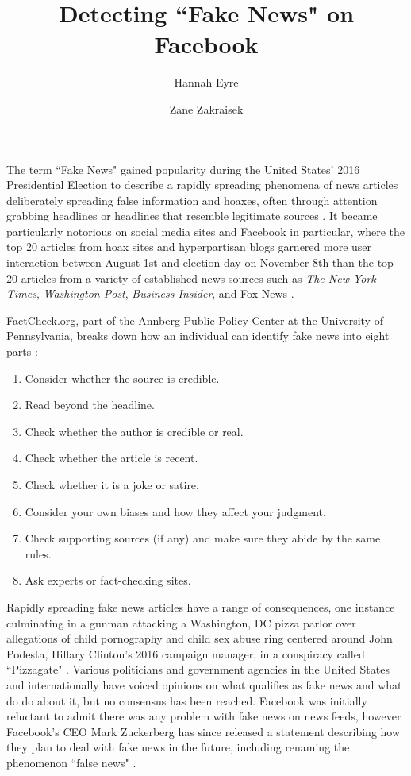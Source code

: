 \documentclass[12pt]{article}
\title{Detecting ``Fake News" on Facebook}
\author{Hannah Eyre \and Zane Zakraisek}
\begin{document}
\maketitle
{}

The term ``Fake News" gained popularity during the United States' 2016 Presidential Election to describe a rapidly spreading phenomena of news articles deliberately spreading false information and hoaxes, often through attention grabbing headlines or headlines that resemble legitimate sources \cite{guardian}. It became particularly notorious on social media sites and Facebook in particular, where the top 20 articles from hoax sites and hyperpartisan blogs garnered more user interaction between August 1st and election day on November 8th than the top 20 articles from a variety of established news sources such as {\it The New York Times}, {\it Washington Post}, {\it Business Insider}, and Fox News \cite{buzzfeed}.

FactCheck.org, part of the Annberg Public Policy Center at the University of Pennsylvania, breaks down how an individual can identify fake news into eight parts \cite{factcheck}:
\begin{enumerate}
\item Consider whether the source is credible.
\item Read beyond the headline.
\item Check whether the author is credible or real.
\item Check whether the article is recent.
\item Check whether it is a joke or satire.
\item Consider your own biases and how they affect your judgment.
\item Check supporting sources (if any) and make sure they abide by the same rules.
\item Ask experts or fact-checking sites.
\end{enumerate}

Rapidly spreading fake news articles have a range of consequences, one instance culminating in a gunman attacking a Washington, DC pizza parlor over allegations of child pornography and child sex abuse ring centered around John Podesta, Hillary Clinton's 2016 campaign manager, in a conspiracy called ``Pizzagate" \cite{pizzagate}. Various politicians and government agencies in the United States and internationally have voiced opinions on what qualifies as fake news and what do do about it, but no consensus has been reached. Facebook was initially reluctant to admit there was any problem with fake news on news feeds, however Facebook's CEO Mark Zuckerberg has since released a statement describing how they plan to deal with fake news in the future, including renaming the phenomenon ``false news" \cite{zuckerberg}.
\end{document}
